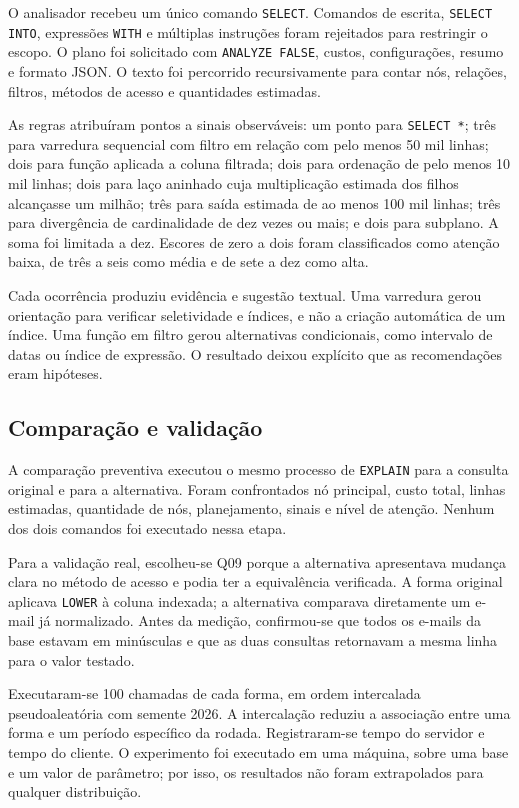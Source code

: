 \documentclass{UNESC}
\newcommand{\codigo}[1]{\texttt{#1}}
\begin{document}
O analisador recebeu um único comando \codigo{SELECT}. Comandos de escrita, \codigo{SELECT INTO}, expressões \codigo{WITH} e múltiplas instruções foram rejeitados para restringir o escopo. O plano foi solicitado com \codigo{ANALYZE FALSE}, custos, configurações, resumo e formato JSON. O texto foi percorrido recursivamente para contar nós, relações, filtros, métodos de acesso e quantidades estimadas.

As regras atribuíram pontos a sinais observáveis: um ponto para \codigo{SELECT *}; três para varredura sequencial com filtro em relação com pelo menos 50 mil linhas; dois para função aplicada a coluna filtrada; dois para ordenação de pelo menos 10 mil linhas; dois para laço aninhado cuja multiplicação estimada dos filhos alcançasse um milhão; três para saída estimada de ao menos 100 mil linhas; três para divergência de cardinalidade de dez vezes ou mais; e dois para subplano. A soma foi limitada a dez. Escores de zero a dois foram classificados como atenção baixa, de três a seis como média e de sete a dez como alta.

Cada ocorrência produziu evidência e sugestão textual. Uma varredura gerou orientação para verificar seletividade e índices, e não a criação automática de um índice. Uma função em filtro gerou alternativas condicionais, como intervalo de datas ou índice de expressão. O resultado deixou explícito que as recomendações eram hipóteses.

\subsection{Comparação e validação}

A comparação preventiva executou o mesmo processo de \codigo{EXPLAIN} para a consulta original e para a alternativa. Foram confrontados nó principal, custo total, linhas estimadas, quantidade de nós, planejamento, sinais e nível de atenção. Nenhum dos dois comandos foi executado nessa etapa.

Para a validação real, escolheu-se Q09 porque a alternativa apresentava mudança clara no método de acesso e podia ter a equivalência verificada. A forma original aplicava \codigo{LOWER} à coluna indexada; a alternativa comparava diretamente um e-mail já normalizado. Antes da medição, confirmou-se que todos os e-mails da base estavam em minúsculas e que as duas consultas retornavam a mesma linha para o valor testado.

Executaram-se 100 chamadas de cada forma, em ordem intercalada pseudoaleatória com semente 2026. A intercalação reduziu a associação entre uma forma e um período específico da rodada. Registraram-se tempo do servidor e tempo do cliente. O experimento foi executado em uma máquina, sobre uma base e um valor de parâmetro; por isso, os resultados não foram extrapolados para qualquer distribuição.
\end{document}

